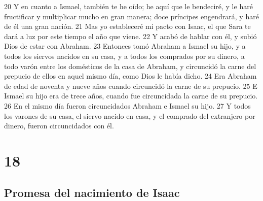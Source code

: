 20 Y en cuanto a Ismael, también te he oído; he aquí que le bendeciré, y le haré fructificar y multiplicar mucho en gran manera; doce príncipes engendrará, y haré de él una gran nación.
21 Mas yo estableceré mi pacto con Isaac, el que Sara te dará a luz por este tiempo el año que viene.
22 Y acabó de hablar con él, y subió Dios de estar con Abraham.
23 Entonces tomó Abraham a Ismael su hijo, y a todos los siervos nacidos en su casa, y a todos los comprados por su dinero, a todo varón entre los domésticos de la casa de Abraham, y circuncidó la carne del prepucio de ellos en aquel mismo día, como Dios le había dicho.
24 Era Abraham de edad de noventa y nueve años cuando circuncidó la carne de su prepucio.
25 E Ismael su hijo era de trece años, cuando fue circuncidada la carne de su prepucio.
26 En el mismo día fueron circuncidados Abraham e Ismael su hijo.
27 Y todos los varones de su casa, el siervo nacido en casa, y el comprado del extranjero por dinero, fueron circuncidados con él.

\chapter{18}

\section*{Promesa del nacimiento de Isaac}

